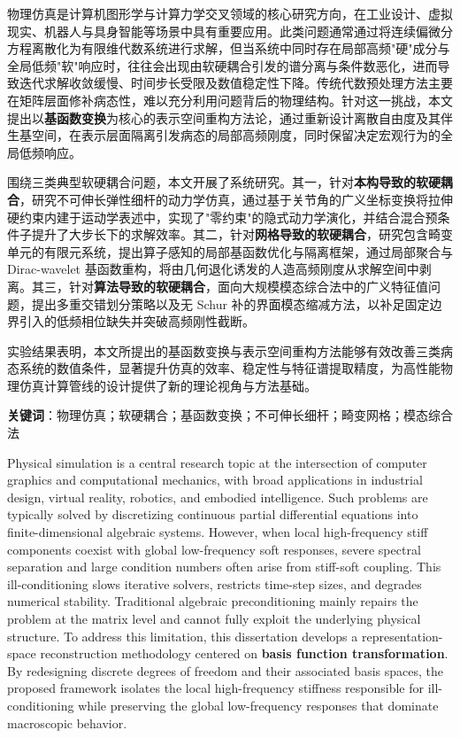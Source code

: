 \cleardoublepage
{}

物理仿真是计算机图形学与计算力学交叉领域的核心研究方向，在工业设计、虚拟现实、机器人与具身智能等场景中具有重要应用。此类问题通常通过将连续偏微分方程离散化为有限维代数系统进行求解，但当系统中同时存在局部高频"硬"成分与全局低频"软"响应时，往往会出现由软硬耦合引发的谱分离与条件数恶化，进而导致迭代求解收敛缓慢、时间步长受限及数值稳定性下降。传统代数预处理方法主要在矩阵层面修补病态性，难以充分利用问题背后的物理结构。针对这一挑战，本文提出以\textbf{基函数变换}为核心的表示空间重构方法论，通过重新设计离散自由度及其伴生基空间，在表示层面隔离引发病态的局部高频刚度，同时保留决定宏观行为的全局低频响应。

围绕三类典型软硬耦合问题，本文开展了系统研究。其一，针对\textbf{本构导致的软硬耦合}，研究不可伸长弹性细杆的动力学仿真，通过基于关节角的广义坐标变换将拉伸硬约束内建于运动学表述中，实现了"零约束"的隐式动力学演化，并结合混合预条件子提升了大步长下的求解效率。其二，针对\textbf{网格导致的软硬耦合}，研究包含畸变单元的有限元系统，提出算子感知的局部基函数优化与隔离框架，通过局部聚合与 Dirac-wavelet 基函数重构，将由几何退化诱发的人造高频刚度从求解空间中剥离。其三，针对\textbf{算法导致的软硬耦合}，面向大规模模态综合法中的广义特征值问题，提出多重交错划分策略以及无 Schur 补的界面模态缩减方法，以补足固定边界引入的低频相位缺失并突破高频刚性截断。

实验结果表明，本文所提出的基函数变换与表示空间重构方法能够有效改善三类病态系统的数值条件，显著提升仿真的效率、稳定性与特征谱提取精度，为高性能物理仿真计算管线的设计提供了新的理论视角与方法基础。

\bigskip
\noindent \textbf{关键词}：物理仿真；软硬耦合；基函数变换；不可伸长细杆；畸变网格；模态综合法

\cleardoublepage
{}

Physical simulation is a central research topic at the intersection of computer graphics and computational mechanics, with broad applications in industrial design, virtual reality, robotics, and embodied intelligence. Such problems are typically solved by discretizing continuous partial differential equations into finite-dimensional algebraic systems. However, when local high-frequency stiff components coexist with global low-frequency soft responses, severe spectral separation and large condition numbers often arise from stiff-soft coupling. This ill-conditioning slows iterative solvers, restricts time-step sizes, and degrades numerical stability. Traditional algebraic preconditioning mainly repairs the problem at the matrix level and cannot fully exploit the underlying physical structure. To address this limitation, this dissertation develops a representation-space reconstruction methodology centered on \textbf{basis function transformation}. By redesigning discrete degrees of freedom and their associated basis spaces, the proposed framework isolates the local high-frequency stiffness responsible for ill-conditioning while preserving the global low-frequency responses that dominate macroscopic behavior.

